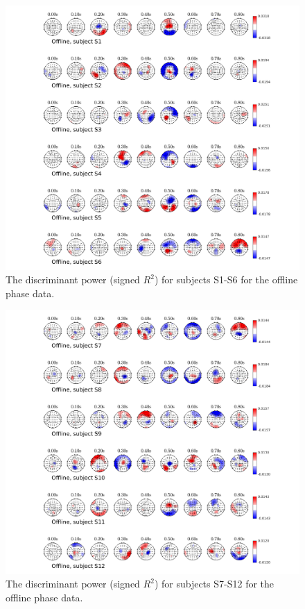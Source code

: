 \documentclass[12pt]{iopart}
\begin{document}
\begin{figure}[h]
\center
    \includegraphics[trim={1cm 0.01cm 1cm 0cm},clip,width=1.0\columnwidth]{../images/TopoSignr2_Offline_individual1.png}
    \caption{The discriminant power (signed $R^2$) for subjects S1-S6 for the offline phase data.}
\label{fig:signRoff1}
\end{figure}

\begin{figure}[h]
\center
    \includegraphics[trim={1cm 0.01cm 1cm 0cm},clip,width=1.0\columnwidth]{../images/TopoSignr2_Offline_individual2.png}
    \caption{The discriminant power (signed $R^2$) for subjects S7-S12 for the offline phase data.}
\label{fig:signRoff2}
\end{figure}
\end{document}
